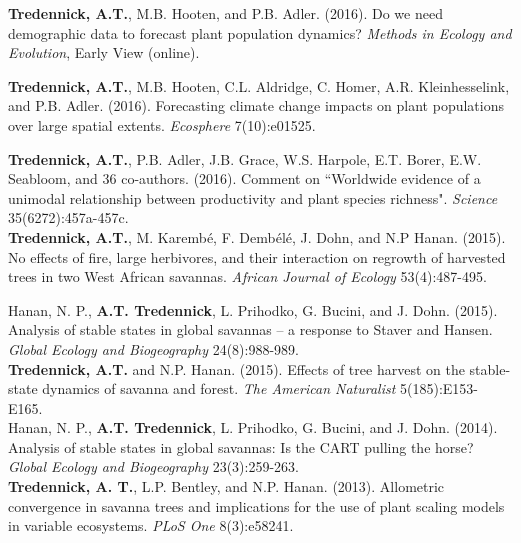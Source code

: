 \documentclass[margin,line]{resume}
\begin{document}
\begin{resume}
	  \textbf{Tredennick, A.T.}, M.B. Hooten,  and P.B. Adler. (2016). Do we need demographic data to forecast plant population dynamics? \emph{Methods in Ecology and Evolution}, Early View (online).
	
	  \textbf{Tredennick, A.T.}, M.B. Hooten, C.L. Aldridge, C. Homer, A.R. Kleinhesselink, and P.B. Adler. (2016). Forecasting climate change impacts on plant populations over large spatial extents. \emph{Ecosphere} 7(10):e01525.
	
	\textbf{Tredennick, A.T.}, P.B. Adler, J.B. Grace, W.S. Harpole, E.T. Borer, E.W. Seabloom, and 36 co-authors. (2016). Comment on ``Worldwide evidence of a unimodal relationship between productivity and plant species richness". \textsl{Science} 35(6272):457a-457c. \vspace{-6mm}\\%
	
	\textbf{Tredennick, A.T.}, M. Karemb\'{e}, F. Demb\'{e}l\'{e}, J. Dohn, and N.P Hanan. (2015). No effects of fire, large herbivores, and their interaction on regrowth of harvested trees in two West African savannas. \textsl{African Journal of Ecology} 53(4):487-495. \vspace{-6mm}\\%
	
			\newpage{}
	
	Hanan, N. P., \textbf{A.T. Tredennick}, L. Prihodko, G. Bucini, and J. Dohn. (2015). Analysis of stable states in global savannas -- a response to Staver and Hansen. 	\textsl{Global Ecology and Biogeography} 24(8):988-989. \vspace{-6mm}\\%
   
     	\textbf{Tredennick, A.T.} and N.P. Hanan. (2015). Effects of tree harvest on the stable-state dynamics of savanna and forest. \textsl{The American Naturalist} 5(185):E153-E165. \vspace{-6mm} \\%
	
	Hanan, N. P., \textbf{A.T. Tredennick}, L. Prihodko, G. Bucini, and J. Dohn. (2014). Analysis of stable states in global savannas: Is the CART pulling the horse? 	\textsl{Global Ecology and Biogeography} 23(3):259-263. \vspace{-6mm}\\%
	
	\textbf{Tredennick, A. T.}, L.P. Bentley, and N.P. Hanan. (2013). Allometric convergence in savanna trees and implications for the use of plant scaling models in 	variable ecosystems. \textsl{PLoS One} 8(3):e58241. \vspace{-6mm}\\%


\end{resume}
\end{document}
